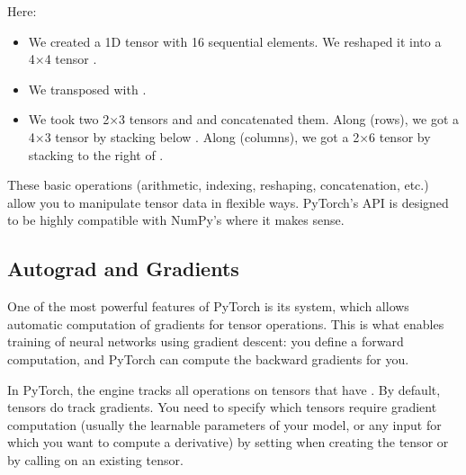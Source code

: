 \documentclass[letterpaper,10pt,english]{jupyterBook}
\begin{document}
\sphinxAtStartPar
Here:
\begin{itemize}
\item {} 
\sphinxAtStartPar
We created a 1\sphinxhyphen{}D tensor  with 16 sequential elements. We reshaped it into a 4×4 tensor .

\item {} 
\sphinxAtStartPar
We transposed  with .

\item {} 
\sphinxAtStartPar
We took two 2×3 tensors  and  and concatenated them. Along  (rows), we got a 4×3 tensor by stacking  below . Along  (columns), we got a 2×6 tensor by stacking  to the right of .

\end{itemize}

\sphinxAtStartPar
These basic operations (arithmetic, indexing, reshaping, concatenation, etc.) allow you to manipulate tensor data in flexible ways. PyTorch’s API is designed to be highly compatible with NumPy’s where it makes sense.


\subsection{Autograd and Gradients}
\label{\detokenize{04:autograd-and-gradients}}
\sphinxAtStartPar
One of the most powerful features of PyTorch is its  system, which allows automatic computation of gradients for tensor operations. This is what enables training of neural networks using gradient descent: you define a forward computation, and PyTorch can compute the backward gradients for you.

\sphinxAtStartPar
In PyTorch, the  engine tracks all operations on tensors that have . By default, tensors do  track gradients. You need to specify which tensors require gradient computation (usually the learnable parameters of your model, or any input for which you want to compute a derivative) by setting  when creating the tensor or by calling  on an existing tensor.
\end{document}
